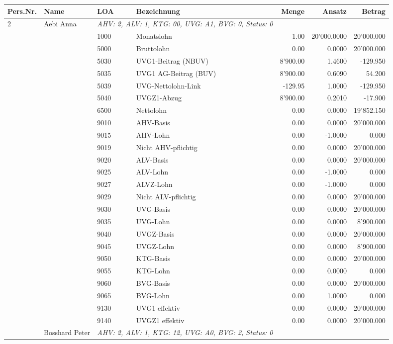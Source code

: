\documentclass[15pt,a4paper]{article}
\begin{document}
\vspace*{-7.15mm}
\begin{longtable}{@{\extracolsep{\fill}}l l l l|r|r|r}
\textbf{Pers.Nr.}&\textbf{Name}&\textbf{LOA}&\textbf{Bezeichnung}&\textbf{Menge}&\textbf{Ansatz}&\textbf{Betrag}\\
\endhead
2&Aebi Anna&\multicolumn{2}{l|}{\small\emph{AHV: 2, ALV: 1, KTG: 00, UVG: A1, BVG: 0, Status: 0}}&& \\
&&1000&Monatslohn&1.00&20'000.0000&20'000.000\\
&&5000&Bruttolohn&0.00&0.0000&20'000.000\\
&&5030&UVG1-Beitrag (NBUV)&8'900.00&1.4600&-129.950\\
&&5035&UVG1 AG-Beitrag (BUV)&8'900.00&0.6090&54.200\\
&&5039&UVG-Nettolohn-Link&-129.95&1.0000&-129.950\\
&&5040&UVGZ1-Abzug&8'900.00&0.2010&-17.900\\
&&6500&Nettolohn&0.00&0.0000&19'852.150\\
&&9010&AHV-Basis&0.00&0.0000&20'000.000\\
&&9015&AHV-Lohn&0.00&-1.0000&0.000\\
&&9019&Nicht AHV-pflichtig&0.00&0.0000&20'000.000\\
&&9020&ALV-Basis&0.00&0.0000&20'000.000\\
&&9025&ALV-Lohn&0.00&-1.0000&0.000\\
&&9027&ALVZ-Lohn&0.00&-1.0000&0.000\\
&&9029&Nicht ALV-pflichtig&0.00&0.0000&20'000.000\\
&&9030&UVG-Basis&0.00&0.0000&20'000.000\\
&&9035&UVG-Lohn&0.00&0.0000&8'900.000\\
&&9040&UVGZ-Basis&0.00&0.0000&20'000.000\\
&&9045&UVGZ-Lohn&0.00&0.0000&8'900.000\\
&&9050&KTG-Basis&0.00&0.0000&20'000.000\\
&&9055&KTG-Lohn&0.00&0.0000&0.000\\
&&9060&BVG-Basis&0.00&0.0000&20'000.000\\
&&9065&BVG-Lohn&0.00&1.0000&0.000\\
&&9130&UVG1 effektiv&0.00&0.0000&20'000.000\\
&&9140&UVGZ1 effektiv&0.00&0.0000&20'000.000\\
\pagebreak
1&Bosshard Peter&\multicolumn{2}{l|}{\small\emph{AHV: 2, ALV: 1, KTG: 12, UVG: A0, BVG: 2, Status: 0}}&& \\

\end{longtable}
\end{document}
